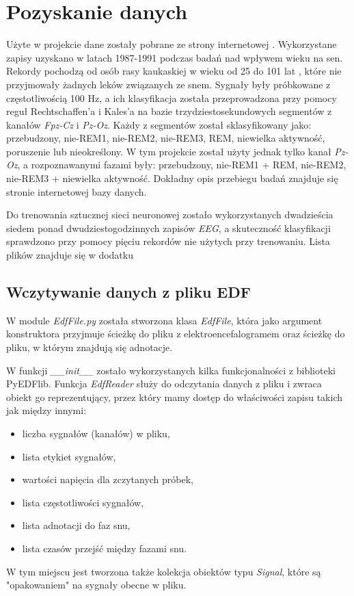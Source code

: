 \documentclass[12pt]{report}
\begin{document}
    \chapter{Pozyskanie danych}
        Użyte w projekcie dane zostały pobrane ze strony internetowej \cite{}. Wykorzystane zapisy uzyskano w latach 1987-1991 podczas badań nad wpływem wieku na sen. Rekordy pochodzą od osób rasy kaukaskiej w wieku od 25 do 101 lat , które nie przyjmowały żadnych leków związanych ze snem. Sygnały były próbkowane z częstotliwością 100 Hz, a ich klasyfikacja została przeprowadzona przy pomocy reguł Rechtschaffen'a i Kales'a na bazie trzydziestosekundowych segmentów z kanałów \textit{Fpz-Cz} i \textit{Pz-Oz}. Każdy z segmentów został sklasyfikowany jako: przebudzony, nie-REM1, nie-REM2, nie-REM3, REM, niewielka aktywność, poruszenie lub nieokreślony.
        W tym projekcie został użyty jednak tylko kanał \textit{Pz-Oz}, a rozpoznawanymi fazami były: przebudzony, nie-REM1 + REM, nie-REM2, nie-REM3 + niewielka aktywność.
        Dokładny opis przebiegu badań znajduje się stronie internetowej bazy danych.
        
        Do trenowania sztucznej sieci neuronowej zostało wykorzystanych dwadzieścia siedem ponad dwudziestogodzinnych zapisów \textit{EEG}, a skuteczność klasyfikacji sprawdzono przy pomocy pięciu rekordów nie użytych przy trenowaniu. Lista plików znajduje się w dodatku %

        \section{Wczytywanie danych z pliku EDF}
            W module \textit{EdfFile.py} została stworzona klasa \textit{EdfFile}, która jako argument konstruktora przyjmuje ścieżkę do pliku z elektroencefalogramem oraz ścieżkę do pliku, w którym znajdują się adnotacje.
            
            W funkcji \textit{\_\_init\_\_} zostało wykorzystanych kilka funkcjonalności z biblioteki PyEDFlib. Funkcja \textit{EdfReader} służy do odczytania danych z pliku i zwraca obiekt go reprezentujący, przez który mamy dostęp do właściwości zapisu takich jak między innymi:
            \begin{itemize}
                \item liczba sygnałów (kanałów) w pliku,
                \item lista etykiet sygnałów,
                \item wartości napięcia dla zczytanych próbek,
                \item lista częstotliwości sygnałów,
                \item lista adnotacji do faz snu,
                \item lista czasów przejść między fazami snu.                
            \end{itemize}
            W tym miejscu jest tworzona także kolekcja obiektów typu \textit{Signal}, które są "opakowaniem" na sygnały obecne w pliku.
\end{document}
